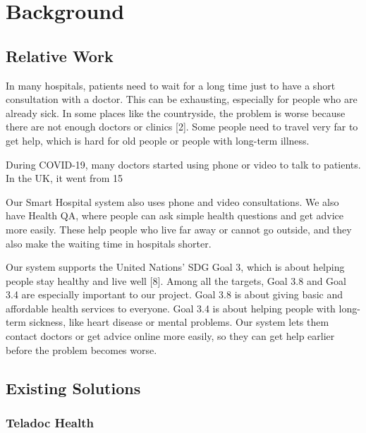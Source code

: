%
%
\chapter{Background}
\label{chap:background}


\section{Relative Work}
\label{sec:relative-work}



In many hospitals, patients need to wait for a long time just to have a short consultation with a doctor. This can be exhausting, especially for people who are already sick. In some places like the countryside, the problem is worse because there are not enough doctors or clinics [2]. Some people need to travel very far to get help, which is hard for old people or people with long-term illness.

During COVID-19, many doctors started using phone or video to talk to patients. In the UK, it went from 15%

Our Smart Hospital system also uses phone and video consultations. We also have Health QA, where people can ask simple health questions and get advice more easily. These help people who live far away or cannot go outside, and they also make the waiting time in hospitals shorter.

Our system supports the United Nations’ SDG Goal 3, which is about helping people stay healthy and live well [8]. Among all the targets, Goal 3.8 and Goal 3.4 are especially important to our project. Goal 3.8 is about giving basic and affordable health services to everyone. Goal 3.4 is about helping people with long-term sickness, like heart disease or mental problems. Our system lets them contact doctors or get advice online more easily, so they can get help earlier before the problem becomes worse.

\section{Existing Solutions}
\label{sec:existing-solutions}


\subsection{Teladoc Health}

